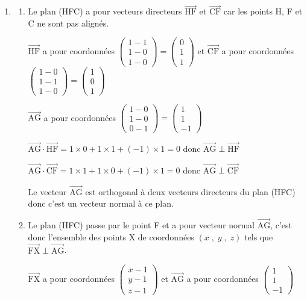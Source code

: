 \documentclass[10pt]{article}
\providecommand{\vectt}[1]{\overrightarrow{\mathrm{#1}}}
\begin{document}
\begin{enumerate}
\item 
	\begin{enumerate}
		\item 
Le plan (HFC) a pour vecteurs directeurs $\vectt{HF}$ et $\vectt{CF}$ car les points H, F et C ne sont pas alignés.		

$\vectt{HF}$ a pour coordonnées
$\begin{pmatrix}
1-1\\1-0\\1-0
\end{pmatrix}
=
\begin{pmatrix}
0\\1\\1
\end{pmatrix}$
et
$\vectt{CF}$ a pour coordonnées
$\begin{pmatrix}
1-0\\1-1\\1-0
\end{pmatrix}
=
\begin{pmatrix}
1\\0\\1
\end{pmatrix}$
		
$\vectt{AG}$ a pour coordonnées
$\begin{pmatrix}
1-0\\1-0\\0-1
\end{pmatrix}
=
\begin{pmatrix}
1\\1\\-1
\end{pmatrix}$		
	
$\vectt{AG}\cdot\vectt{HF}=1\times 0 + 1\times 1 + (-1)\times 1 = 0$
donc $\vectt{AG}\perp\vectt{HF}$
		
$\vectt{AG}\cdot\vectt{CF}=1\times 1 + 1\times 0 + (-1)\times 1 = 0$
donc $\vectt{AG}\perp\vectt{CF}$		

Le vecteur $\vectt{AG}$ est orthogonal à deux vecteurs directeurs du plan (HFC) donc c'est un vecteur normal à ce plan.
		
		\item 
Le plan (HFC) passe par le point F et a pour vecteur normal $\vectt{AG}$, c'est donc l'ensemble des points X de coordonnées $(x\;,\;y\;,\;z)$ tels que 
$\vectt{FX}\perp\vectt{AG}$.		
		
$\vectt{FX}$ a pour coordonnées
$\begin{pmatrix}
x-1\\y-1\\z-1
\end{pmatrix}$
et $\vectt{AG}$ a pour coordonnées
$\begin{pmatrix}
1\\1\\-1
\end{pmatrix}$


\end{enumerate}
\end{enumerate}
\end{document}
